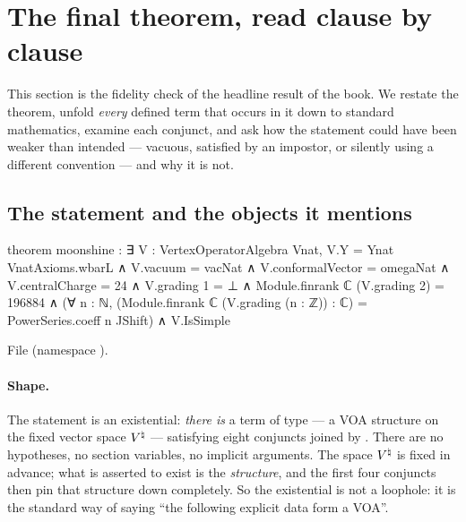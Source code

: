 \section{The final theorem, read clause by clause}\label{ch14:sec:decode}

This section is the fidelity check of the headline result of the book.  We restate the theorem,
unfold \emph{every} defined term that occurs in it down to standard mathematics, examine each conjunct,
and ask how the statement could have been weaker than intended — vacuous, satisfied by an impostor, or
silently using a different convention — and why it is not.

\subsection{The statement and the objects it mentions}

\begin{leancode}
theorem moonshine :
    ∃ V : VertexOperatorAlgebra Vnat,
      V.Y = Ynat VnatAxioms.wbarL ∧ V.vacuum = vacNat ∧ V.conformalVector = omegaNat ∧
      V.centralCharge = 24 ∧
      V.grading 1 = ⊥ ∧
      Module.finrank ℂ (V.grading 2) = 196884 ∧
      (∀ n : ℕ, (Module.finrank ℂ (V.grading (n : ℤ)) : ℂ) = PowerSeries.coeff n JShift) ∧
      V.IsSimple
\end{leancode}
File  (namespace ).

\paragraph{Shape.}  The statement is an existential: \emph{there is} a term  of type
 — a VOA structure on the fixed vector space ${V^{\natural}}$ — satisfying eight
conjuncts joined by .  There are no hypotheses, no section variables, no implicit arguments.
The space ${V^{\natural}}$ is fixed in advance; what is asserted to exist is the \emph{structure}, and the first
four conjuncts then pin that structure down completely.  So the existential is not a
loophole: it is the standard way of saying ``the following explicit data form a VOA''.

